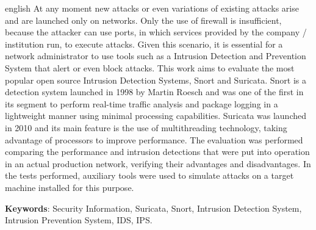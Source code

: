 \documentclass[
	12pt,				
	openright,		
	twoside,	
	a4paper,
	english,	
	brazil	
	]{abntex2}
\begin{document}
\begin{resumo}[Abstract]
 \begin{otherlanguage*}{english}
   \vspace{\onelineskip}
   \noindent 
At any moment new attacks or even variations of existing attacks arise and are launched only on networks. Only the use of firewall is insufficient, because the attacker can use ports, in which services provided by the company / institution run, to execute attacks. Given this scenario, it is essential for a network administrator to use tools such as a Intrusion Detection and Prevention System that alert or even block attacks. This work aims to evaluate the most popular open source Intrusion Detection Systems, Snort and Suricata. Snort is a detection system launched in 1998 by Martin Roesch and was one of the first in its segment to perform real-time traffic analysis and package logging in a lightweight manner using minimal processing capabilities. Suricata was launched in 2010 and its main feature is the use of multithreading technology, taking advantage of processors to improve performance. The evaluation was performed comparing the performance and intrusion detections that were put into operation in an actual production network, verifying their advantages and disadvantages. In the tests performed, auxiliary tools were used to simulate attacks on a target machine installed for this purpose.

   \textbf{Keywords}: Security Information, Suricata, Snort, Intrusion Detection System, Intrusion Prevention System, IDS, IPS.
 \end{otherlanguage*}
\end{resumo}
\listoffigures*
\cleardoublepage
{}
\listoftables*
\cleardoublepage
\end{document}
